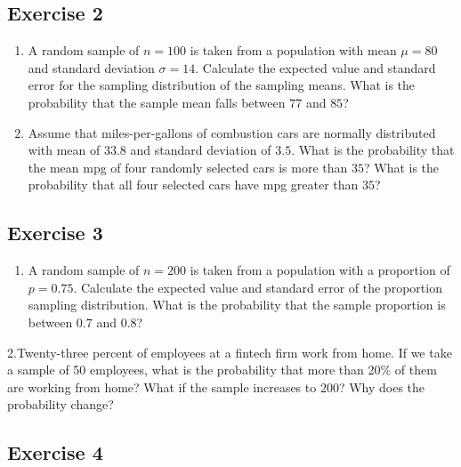 \documentclass[
  letterpaper,
  DIV=11,
  numbers=noendperiod]{scrreprt}
\providecommand{\tightlist}{%
  \setlength{\itemsep}{0pt}\setlength{\parskip}{0pt}}\usepackage{longtable,booktabs,array}
\begin{document}
\hypertarget{exercise-2-20}{%
\subsection*{Exercise 2}\label{exercise-2-20}}

\begin{enumerate}
\def\labelenumi{\arabic{enumi}.}
\item
  A random sample of \(n=100\) is taken from a population with mean
  \(\mu=80\) and standard deviation \(\sigma=14\). Calculate the
  expected value and standard error for the sampling distribution of the
  sampling means. What is the probability that the sample mean falls
  between \(77\) and \(85\)?
\item
  Assume that miles-per-gallons of combustion cars are normally
  distributed with mean of \(33.8\) and standard deviation of \(3.5\).
  What is the probability that the mean mpg of four randomly selected
  cars is more than \(35\)? What is the probability that all four
  selected cars have mpg greater than \(35\)?
\end{enumerate}

\hypertarget{exercise-3-20}{%
\subsection*{Exercise 3}\label{exercise-3-20}}

\begin{enumerate}
\def\labelenumi{\arabic{enumi}.}
\tightlist
\item
  A random sample of \(n=200\) is taken from a population with a
  proportion of \(p=0.75\). Calculate the expected value and standard
  error of the proportion sampling distribution. What is the probability
  that the sample proportion is between \(0.7\) and \(0.8\)?
\end{enumerate}

2.Twenty-three percent of employees at a fintech firm work from home. If
we take a sample of 50 employees, what is the probability that more than
20\% of them are working from home? What if the sample increases to 200?
Why does the probability change?

\hypertarget{exercise-4-8}{%
\subsection*{Exercise 4}\label{exercise-4-8}}
\end{document}
